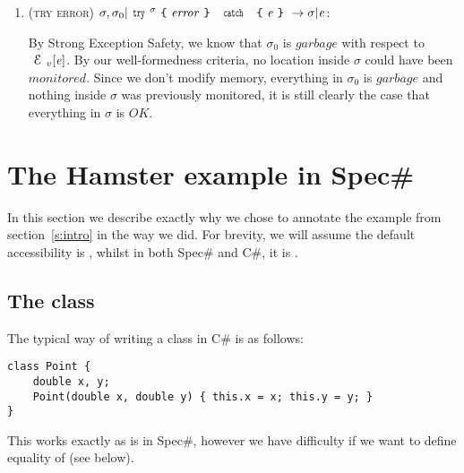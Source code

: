 \begin{enumerate}
\begin{itemize}
\end{itemize}

\item (\textsc{try error}) $\sigma,\sigma_0|\Kw{try}^\sigma\oC \mathit{error}\cC\ \Kw{catch}\ \oC\e\cC\rightarrow \sigma|\e$:

	By Strong Exception Safety, we know that $\sigma_0$ is $\mathit{garbage}$ with respect to $\ctx_v[\e]$. By our well-formedness criteria, no location inside $\sigma$ could have been $monitored$.
	Since we don't modify memory, everything in $\sigma_0$ is $\mathit{garbage}$ and nothing inside $\sigma$ was previously monitored, it is still clearly the case that everything in $\sigma$ is $\mathit{OK}$. 
\end{enumerate}

\section{The Hamster example in Spec\#}
\label{s:justice}

In this section we describe exactly why we chose to annotate the example from section~\ref{s:intro} in the way we did. For brevity, we will assume the default accessibility is \Q@public@, whilst in both Spec\# and C\#, it is \Q@private@.

\subsection{The \Q@Point@ class} 
The typical way of writing a \Q@Point@ class in C\# is as follows:
\begin{lstlisting}
class Point {
	double x, y;
	Point(double x, double y) { this.x = x; this.y = y; }
}
\end{lstlisting}
This works exactly as is in Spec\#, however we have difficulty if we want to define equality of \Q@Point@s (see below).

